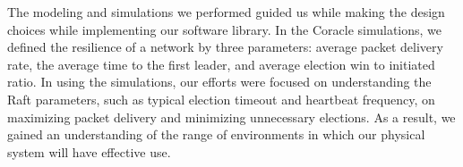The modeling and simulations we performed guided us while making the design choices while implementing our software library. In the Coracle simulations, we defined the resilience of a network by three parameters: average packet delivery rate, the average time to the first leader, and average election win to initiated ratio. In using the simulations, our efforts were focused on understanding the Raft parameters, such as typical election timeout and heartbeat frequency, on maximizing packet delivery and minimizing unnecessary elections. As a result, we gained an understanding of the range of environments in which our physical system will have effective use.